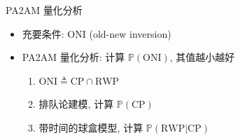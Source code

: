 \begin{frame}{PA2AM 量化分析}
  \vspace{0.10cm}

  \begin{itemize}
    \setlength{\itemsep}{10pt}
	\item 充要条件: ONI (old-new inversion) 
    \item PA2AM 量化分析: 计算 $\mathbb{P}(\textrm{ONI})$, 其值越小越好
      \begin{enumerate}
        \setlength{\itemsep}{3pt}
        \item $\textrm{ONI} \triangleq \textrm{CP} \cap \textrm{RWP}$
        \item 排队论建模, 计算 $\mathbb{P}(\textrm{CP})$ \item 带时间的球盒模型, 计算 
          $\mathbb{P}(\textrm{RWP|CP})$
      \end{enumerate}
  \end{itemize}
\end{frame}
